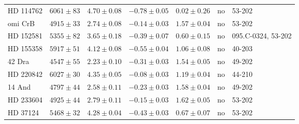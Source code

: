\documentclass{aa}
\begin{document}
\begin{table*}[htb!]
\begin{tabular}{lllllll}
    HD 114762     &  $6061 \pm  83$      &  $4.70 \pm 0.08$    &  $-0.78 \pm 0.05$    &  $0.02 \pm 0.26$             &             no              &  53-202                                                                                                                  \\
      omi CrB     &  $4915 \pm  33$      &  $2.74 \pm 0.08$    &  $-0.14 \pm 0.03$    &  $1.57 \pm 0.04$             &             no              &  53-202                                                                                                                  \\
    HD 152581     &  $5355 \pm  82$      &  $3.65 \pm 0.18$    &  $-0.39 \pm 0.07$    &  $0.60 \pm 0.15$             &             no              &  095.C-0324, 53-202                                                                                                      \\
    HD 155358     &  $5917 \pm  51$      &  $4.12 \pm 0.08$    &  $-0.55 \pm 0.04$    &  $1.06 \pm 0.08$             &             no              &  40-203                                                                                                                  \\
       42 Dra     &  $4547 \pm  55$      &  $2.23 \pm 0.10$    &  $-0.31 \pm 0.03$    &  $1.54 \pm 0.05$             &             no              &  49-202                                                                                                                  \\
    HD 220842     &  $6027 \pm  30$      &  $4.35 \pm 0.05$    &  $-0.08 \pm 0.03$    &  $1.19 \pm 0.04$             &             no              &  44-210                                                                                                                  \\
       14 And     &  $4797 \pm  44$      &  $2.58 \pm 0.11$    &  $-0.23 \pm 0.03$    &  $1.58 \pm 0.04$             &             no              &  49-202                                                                                                                  \\
    HD 233604     &  $4925 \pm  44$      &  $2.79 \pm 0.11$    &  $-0.15 \pm 0.03$    &  $1.62 \pm 0.05$             &             no              &  53-202                                                                                                                  \\
     HD 37124     &  $5468 \pm  32$      &  $4.28 \pm 0.04$    &  $-0.43 \pm 0.03$    &  $0.67 \pm 0.07$             &             no              &  53-202                                                                                                                  \\

\end{tabular}
\end{table*}
\end{document}
